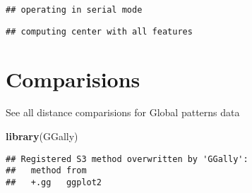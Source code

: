 \documentclass[
]{book}
\newenvironment{Shaded}{\begin{snugshade}}{\end{snugshade}}
\newcommand{\KeywordTok}[1]{\textcolor[rgb]{0.13,0.29,0.53}{\textbf{#1}}}
\newcommand{\NormalTok}[1]{#1}
\begin{document}
\begin{verbatim}
## operating in serial mode
\end{verbatim}

\begin{verbatim}
## computing center with all features
\end{verbatim}

\hypertarget{comparisions}{%
\chapter{Comparisions}\label{comparisions}}

See all distance comparisions for Global patterns data

\begin{Shaded}
\begin{Highlighting}[]
\KeywordTok{library}\NormalTok{(GGally)}
\end{Highlighting}
\end{Shaded}

\begin{verbatim}
## Registered S3 method overwritten by 'GGally':
##   method from   
##   +.gg   ggplot2
\end{verbatim}
\end{document}
